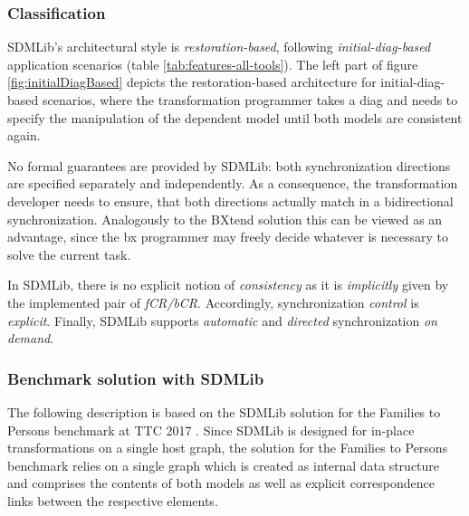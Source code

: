 \subsubsection{Classification}
SDMLib's architectural style is \emph{restoration-based}, following \emph{initial-diag-based} application scenarios (table \ref{tab:features-all-tools}). The left part of figure \ref{fig:initialDiagBased} depicts the restoration-based architecture for initial-diag-based scenarios, where the transformation programmer takes a diag and needs to specify the manipulation of the dependent model until both models are consistent again. 

No formal guarantees are provided by SDMLib: both synchronization directions are specified separately and independently. As a consequence, the transformation developer needs to ensure, that both directions actually match in a bidirectional synchronization. Analogously to the BXtend solution this can be viewed as an advantage, since the bx programmer may freely decide whatever is necessary to solve the current task.

In SDMLib, there is no explicit notion of \emph{consistency} as it is \emph{implicitly} given by the implemented pair of \emph{fCR/bCR}. Accordingly, synchronization \emph{control} is \emph{explicit}. Finally, SDMLib supports \emph{automatic} and \emph{directed} synchronization \emph{on demand}.

\subsubsection{Benchmark solution with SDMLib}



The following description is based on the SDMLib solution for the Families to Persons benchmark at TTC 2017 \cite{Zundorf2017}. Since SDMLib is designed for in-place transformations on a single host graph, the solution for the Families to Persons benchmark relies on a single graph which is created as internal data structure and comprises the contents of both models as well as explicit correspondence links between the respective elements. 

